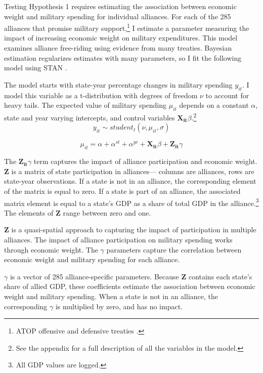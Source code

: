\documentclass[12pt]{article}
\begin{document}
Testing Hypothesis 1 requires estimating the association between economic weight and military spending for individual alliances. 
For each of the 285 alliances that promise military support,\footnote{ATOP offensive and defensive treaties \citep{Leedsetal2002}.} I estimate a parameter measuring the impact of increasing economic weight on military expenditures. 
This model examines alliance free-riding using evidence from many treaties.  
Bayesian estimation regularizes estimates with many parameters, so I fit the following model using STAN \citep{Carpenteretal2016}.


The model starts with state-year percentage changes in military spending $y_{it}$.
I model this variable as a t-distribution with degrees of freedom $\nu$ to account for heavy tails.
The expected value of military spending $\mu_{it}$ depends on a constant $\alpha$, state and year varying intercepts, and control variables $\mathbf{X_{it}} \beta$.\footnote{See the appendix for a full description of all the variables in the model.} 
\begin{equation}
y_{it} \sim student_t(\nu, \mu_{it}, \sigma) 
\end{equation}

\begin{equation}
\mu_{it} = \alpha + \alpha^{st} + \alpha^{yr} + \mathbf{X_{it}} \beta + \mathbf{Z_{it}} \gamma 
\end{equation}


The $\mathbf{Z_{it}} \gamma$ term captures the impact of alliance participation and economic weight.  
\textbf{Z} is a matrix of state participation in alliances--- columns are alliances, rows are state-year observations. 
If a state is not in an alliance, the corresponding element of the matrix is equal to zero. 
If a state is part of an alliance, the associated matrix element is equal to a state's GDP as a share of total GDP in the alliance.\footnote{All GDP values are logged.} 
The elements of \textbf{Z} range between zero and one. 


\textbf{Z} is a quasi-spatial approach to capturing the impact of participation in multiple alliances.
The impact of alliance participation on military spending works through economic weight.  
The $\gamma$ parameters capture the correlation between economic weight and military spending for each alliance. 


$\gamma$ is a vector of 285 alliance-specific parameters.  
Because \textbf{Z} contains each state's share of allied GDP, these coefficients estimate the association between economic weight and military spending. 
When a state is not in an alliance, the corresponding $\gamma$ is multiplied by zero, and has no impact. 
\end{document}
